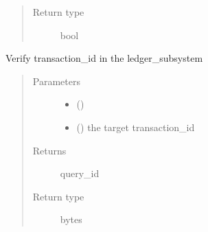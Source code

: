 \documentclass[letterpaper,10pt,english]{sphinxmanual}
\begin{document}
\begin{fulllineitems}
\begin{fulllineitems}
\begin{quote}
\begin{description}
\item[{Return type}] \leavevmode
bool

\end{description}\end{quote}

\end{fulllineitems}


\begin{fulllineitems}
\label{\detokenize{bbc1.core.bbc_app:bbc1.core.bbc_app.BBcAppClient.verify_in_ledger_subsystem}}
Verify transaction\_id in the ledger\_subsystem
\begin{quote}\begin{description}
\item[{Parameters}] \leavevmode\begin{itemize}
\item {} 
 () \textendash{} 

\item {} 
 () \textendash{} the target transaction\_id

\end{itemize}

\item[{Returns}] \leavevmode
query\_id

\item[{Return type}] \leavevmode
bytes

\end{description}\end{quote}

\end{fulllineitems}


\end{fulllineitems}

\end{document}
